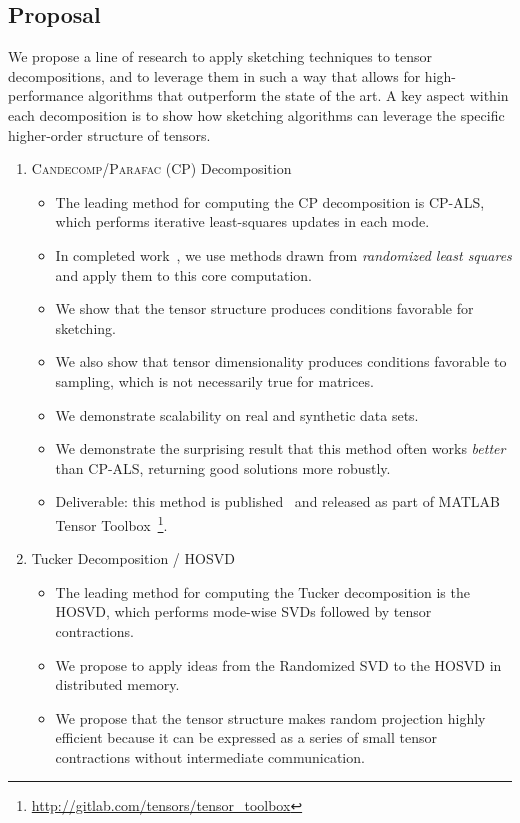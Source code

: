 \subsection{Proposal}
We propose a line of research to apply sketching techniques to tensor decompositions, and to leverage them in such a way that allows for high-performance algorithms that outperform the state of the art. A key aspect within each decomposition is to show how sketching algorithms can leverage the specific higher-order structure of tensors.
\begin{enumerate}
\item \textsc{Candecomp/Parafac} (CP) Decomposition
\begin{itemize}
	\item The leading method for computing the CP decomposition is CP-ALS, which performs iterative least-squares updates in each mode.
	\item In completed work~\cite{caseyb}, we use methods drawn from \emph{randomized least squares} and apply them to this core computation.
	\item We show that the tensor structure produces conditions favorable for sketching.
	\item We also show that tensor dimensionality produces conditions favorable to sampling, which is not necessarily true for matrices.
	\item We demonstrate scalability on real and synthetic data sets.
	\item We demonstrate the surprising result that this method often works \emph{better} than CP-ALS, returning good solutions more robustly.
	\item Deliverable: this method is published~\cite{caseyb} and released as part of MATLAB Tensor Toolbox~\cite{TTB_Software}\footnote{\url{http://gitlab.com/tensors/tensor_toolbox}}.
\end{itemize}
\item Tucker Decomposition / HOSVD
\begin{itemize}
	\item The leading method for computing the Tucker decomposition is the HOSVD, which performs mode-wise SVDs followed by tensor contractions.
	\item We propose to apply ideas from the Randomized SVD to the HOSVD in distributed memory.
	\item We propose that the tensor structure makes random projection highly efficient because it can be expressed as a series of small tensor contractions without intermediate communication. 

\end{itemize}
\end{enumerate}
